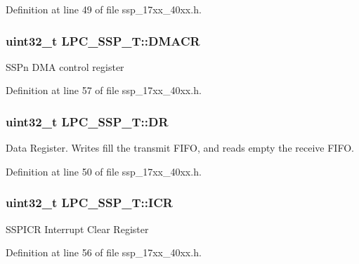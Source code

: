 Definition at line 49 of file ssp\+\_\+17xx\+\_\+40xx.\+h.

\subsubsection[{\texorpdfstring{D\+M\+A\+CR}{DMACR}}]{ uint32\+\_\+t L\+P\+C\+\_\+\+S\+S\+P\+\_\+\+T\+::\+D\+M\+A\+CR}\hypertarget{structLPC__SSP__T_a6a74b0cbac37f424e198ccef9a208d65}{}\label{structLPC__SSP__T_a6a74b0cbac37f424e198ccef9a208d65}
S\+S\+Pn D\+MA control register 

Definition at line 57 of file ssp\+\_\+17xx\+\_\+40xx.\+h.

\subsubsection[{\texorpdfstring{DR}{DR}}]{ uint32\+\_\+t L\+P\+C\+\_\+\+S\+S\+P\+\_\+\+T\+::\+DR}\hypertarget{structLPC__SSP__T_a7a32964f3ca72981b80cf4012c515ea8}{}\label{structLPC__SSP__T_a7a32964f3ca72981b80cf4012c515ea8}
Data Register. Writes fill the transmit F\+I\+FO, and reads empty the receive F\+I\+FO. 

Definition at line 50 of file ssp\+\_\+17xx\+\_\+40xx.\+h.

\subsubsection[{\texorpdfstring{I\+CR}{ICR}}]{ uint32\+\_\+t L\+P\+C\+\_\+\+S\+S\+P\+\_\+\+T\+::\+I\+CR}\hypertarget{structLPC__SSP__T_ad788fb9f7178c7a79588b429f74b9946}{}\label{structLPC__SSP__T_ad788fb9f7178c7a79588b429f74b9946}
S\+S\+P\+I\+CR Interrupt Clear Register 

Definition at line 56 of file ssp\+\_\+17xx\+\_\+40xx.\+h.

